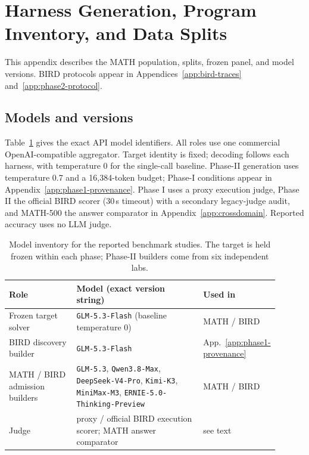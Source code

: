 \section{Harness Generation, Program Inventory, and Data Splits}\label{app:inventory}
This appendix describes the MATH population, splits, frozen panel, and model
versions. BIRD protocols appear in Appendices~\ref{app:bird-traces}
and~\ref{app:phase2-protocol}.


\FloatBarrier

\FloatBarrier
\subsection{Models and versions}\label{app:models}

Table~\ref{tab:models} gives the exact API model identifiers. All roles
use one commercial OpenAI-compatible aggregator. Target identity is fixed;
decoding follows each harness, with temperature $0$ for the single-call
baseline. Phase-II generation uses temperature 0.7 and a 16{,}384-token
budget; Phase-I conditions appear in Appendix~\ref{app:phase1-provenance}.
Phase I uses a proxy execution judge, Phase II the official BIRD scorer
(30\,s timeout) with a secondary legacy-judge audit, and MATH-500 the
answer comparator in Appendix~\ref{app:crossdomain}. Reported accuracy
uses no LLM judge.

\begin{table}[H]
\centering
\small
\begin{tabular}{p{0.26\linewidth}p{0.50\linewidth}p{0.14\linewidth}}
\toprule
Role & Model (exact version string) & Used in \\
\midrule
Frozen target solver & \texttt{GLM-5.3-Flash} (baseline temperature $0$) & MATH / BIRD \\
BIRD discovery builder & \texttt{GLM-5.3-Flash} & App.~\ref{app:phase1-provenance} \\
MATH / BIRD admission builders & \texttt{GLM-5.3}, \texttt{Qwen3.8-Max},
\texttt{DeepSeek-V4-Pro}, \texttt{Kimi-K3}, \texttt{MiniMax-M3},
\texttt{ERNIE-5.0-Thinking-Preview} & MATH / BIRD \\
Judge & proxy / official BIRD execution scorer; MATH answer comparator & see text \\
\bottomrule
\end{tabular}
\caption{Model inventory for the reported benchmark studies. The target is held frozen within each
phase; Phase-II builders come from six independent labs.}
\label{tab:models}
\end{table}
